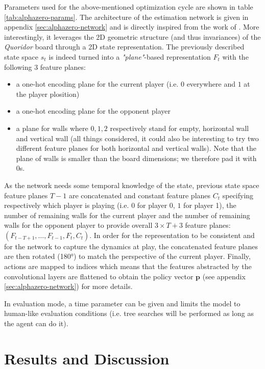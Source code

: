 \documentclass[journal, a4paper]{IEEEtran}
\begin{document}
    Parameters used for the above-mentioned optimization cycle are shown in table \ref{tab:alphazero-params}. The architecture of the estimation network is given in appendix \ref{sec:alphazero-network} and is directly inspired from the work of \cite{alphazero}. More interestingly, it leverages the 2D geometric structure (and thus invariances) of the \textit{Quoridor} board through a 2D state representation. The previously described state space $s_t$ is indeed turned into a \textit{"plane"}-based representation $F_t$ with the following $3$ feature planes:
    \begin{itemize}
        \item a one-hot encoding plane for the current player (i.e. $0$ everywhere and $1$ at the player plosition)
        \item a one-hot encoding plane for the opponent player 
        \item a plane for walls where $0, 1, 2$ respectively stand for empty, horizontal wall and vertical wall (all things considered, it could also be interesting to try two different feature planes for both horizontal and vertical walls). Note that the plane of walls is smaller than the board dimensions; we therefore pad it with $0$s.
    \end{itemize}  
    As the network needs some temporal knowledge of the state, previous state space feature planes $T-1$ are concatenated and constant feature planes $C_t$ specifying respectively which player is playing (i.e. $0$ for player 0, $1$ for player 1), the number of remaining walls for the current player and the number of remaining walls for the opponent player to provide overall $3\times T + 3$ feature planes: $(F_{t-T+1}, \ldots, F_{t-1}, F_t, C_t)$. In order for the representation to be consistent and for the network to capture the dynamics at play, the concatenated feature planes are then rotated (180°) to match the perspective of the current player. Finally, actions are mapped to indices which means that the features abstracted by the convolutional layers are flattened to obtain the policy vector $\mathbf{p}$ (see appendix \ref{sec:alphazero-network}) for more details.
    
    In evaluation mode, a time parameter can be given and limits the model to human-like evaluation conditions (i.e. tree searches will be performed as long as the agent can do it).


\section{Results and Discussion}
\label{sec:results}
\end{document}

